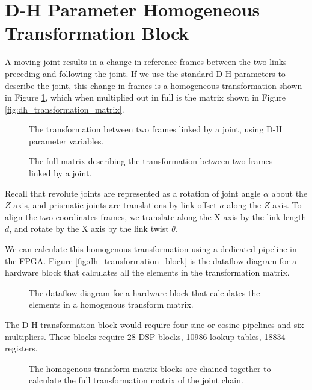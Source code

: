 \section{D-H Parameter Homogeneous Transformation Block}

A moving joint results in a change in reference frames between the two links preceding and following the joint. If we use the standard D-H parameters to describe the joint, this change in frames is a homogeneous transformation shown in Figure \ref{fig:dh_transform_equation}, which when multiplied out in full is the matrix shown in Figure \ref{fig:dh_transformation_matrix}.

\begin{figure}[ht]
\center
{}
\caption{The transformation between two frames linked by a joint, using D-H parameter variables.}
\label{fig:dh_transform_equation}
\end{figure}

\begin{figure}[ht]
\center
{}
\caption{The full matrix describing the transformation between two frames linked by a joint.}
\label{fig:dh_transform_matrix}
\end{figure}

Recall that revolute joints are represented as a rotation of joint angle $\alpha$ about the $Z$ axis, and prismatic joints are translations by link offset $a$ along the $Z$ axis. To align the two coordinates frames, we translate along the X axis by the link length $d$, and rotate by the X axis by the link twist $\theta$.

We can calculate this homogenous transformation using a dedicated pipeline in the FPGA. Figure \ref{fig:dh_transformation_block} is the dataflow diagram for a hardware block that calculates all the elements in the transformation matrix.

\begin{figure}[ht]
\center
{}
\caption{The dataflow diagram for a hardware block that calculates the elements in a homogenous transform matrix.}
\label{fig:dh_transform_block}
\end{figure}

The D-H transformation block would require four sine or cosine pipelines and six multipliers. These blocks require 28 DSP blocks, 10986 lookup tables, 18834 registers.

\begin{figure}[ht]
\center
{}
\caption{The homogenous transform matrix blocks are chained together to calculate the full transformation matrix of the joint chain.}
\label{fig:dh_transform_block}
\end{figure}
